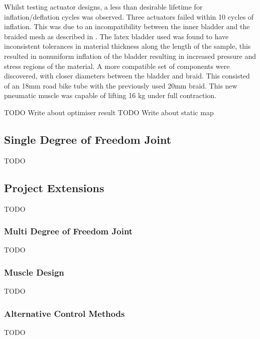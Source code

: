 \documentclass[11pt,a4paper]{article}
\begin{document}
Whilst testing actuator designs, a less than desirable lifetime for inflation/deflation cycles was observed. Three actuators failed within 10 cycles of inflation. This was due to an incompatibility between the inner bladder and the braided mesh as described in \cite{andrikopoulos_nikolakopoulos_2017}. The latex bladder used was found to have inconsistent tolerances in material thickness along the length of the sample, this resulted in nonuniform inflation of the bladder resulting in increased pressure and stress regions of the material. A more compatible set of components were discovered, with closer diameters between the bladder and braid. This consisted of an 18mm road bike tube with the previously used 20mm braid. This new pneumatic muscle was capable of lifting 16 kg under full contraction.\newline

\newline TODO Write about optimiser result
\newline TODO Write about static map

\subsection{Single Degree of Freedom Joint}
\label{sub:two_dof_joint}
TODO

\subsection{Project Extensions}
\label{sub:project_extensions}
TODO

\subsubsection{Multi Degree of Freedom Joint}
\label{sub:two_dof_joint}
TODO

\subsubsection{Muscle Design}
\label{sub:future_muscle_design}
TODO

\subsubsection{Alternative Control Methods}
\label{sub:alternative_control_methods}
TODO
\end{document}
